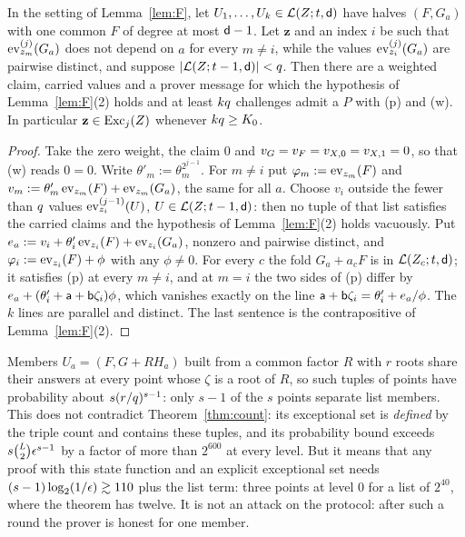 \begin{proposition}\label{prop:floor}
In the setting of Lemma~\ref{lem:F}, let $U_1,\dots,U_k\in\mathcal{L}(Z;t,\mathsf{d})$ have halves $(F,G_a)$ with one common $F$ of degree at most $\mathsf{d}-1$. Let $\mathbf z$ and an index $i$ be such that $\operatorname{ev}^{(j)}_{z_m}(G_a)$ does not depend on $a$ for every $m\ne i$, while the values $\operatorname{ev}^{(j)}_{z_i}(G_a)$ are pairwise distinct, and suppose $|\mathcal{L}(Z;t-1,\mathsf{d})|<q$. Then there are a weighted claim, carried values and a prover message for which the hypothesis of Lemma~\ref{lem:F}(2) holds and at least $kq$ challenges admit a $P$ with \textnormal{(p)} and \textnormal{(w)}. In particular $\mathbf z\in\operatorname{Exc}_j(Z)$ whenever $kq\ge K_0$.
\end{proposition}
\begin{proof}
Take the zero weight, the claim $0$ and $v_G=v_F=v_{X,0}=v_{X,1}=0$, so that (w) reads $0=0$. Write $\theta'_m:=\theta_m^{2^{j-1}}$. For $m\ne i$ put $\varphi_m:=\operatorname{ev}_{z_m}(F)$ and $v_m:=\theta'_m\operatorname{ev}_{z_m}(F)+\operatorname{ev}_{z_m}(G_a)$, the same for all $a$. Choose $v_i$ outside the fewer than $q$ values $\operatorname{ev}^{(j-1)}_{z_i}(U)$, $U\in\mathcal{L}(Z;t-1,\mathsf{d})$: then no tuple of that list satisfies the carried claims and the hypothesis of Lemma~\ref{lem:F}(2) holds vacuously. Put $e_a:=v_i+\theta'_i\operatorname{ev}_{z_i}(F)+\operatorname{ev}_{z_i}(G_a)$, nonzero and pairwise distinct, and $\varphi_i:=\operatorname{ev}_{z_i}(F)+\phi$ with any $\phi\ne0$. For every $c$ the fold $G_a+a_cF$ is in $\mathcal{L}(Z_c;t,\mathsf{d})$; it satisfies (p) at every $m\ne i$, and at $m=i$ the two sides of (p) differ by $e_a+(\theta'_i+\mathsf{a}+\mathsf{b}\zeta_i)\phi$, which vanishes exactly on the line $\mathsf{a}+\mathsf{b}\zeta_i=\theta'_i+e_a/\phi$. The $k$ lines are parallel and distinct. The last sentence is the contrapositive of Lemma~\ref{lem:F}(2).
\end{proof}

Members $U_a=(F,G+RH_a)$ built from a common factor $R$ with $r$ roots share their answers at every point whose $\zeta$ is a root of $R$, so such tuples of points have probability about $s(r/q)^{s-1}$: only $s-1$ of the $s$ points separate list members. This does not contradict Theorem~\ref{thm:count}: its exceptional set is \emph{defined} by the triple count and contains these tuples, and its probability bound exceeds $s\binom L2\epsilon^{s-1}$ by a factor of more than $2^{600}$ at every level. But it means that any proof with this state function and an explicit exceptional set needs $(s-1)\log_2(1/\epsilon)\gtrsim110$ plus the list term: three points at level $0$ for a list of $2^{40}$, where the theorem has twelve. It is not an attack on the protocol: after such a round the prover is honest for one member.

